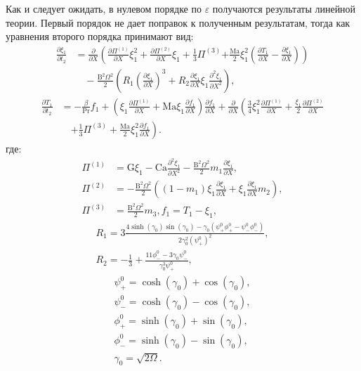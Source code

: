 \documentclass[12pt,a4paper]{article}
\begin{document}
Как и следует ожидать, в нулевом порядке по $\varepsilon$ получаются результаты линейной теории. Первый порядок не дает поправок к полученным результатам, тогда как уравнения второго порядка принимают вид:
\begin{align}
	\frac{\partial\xi_1}{\partial t_2} &= \frac{\partial}{\partial X}\left(\frac{\partial\Pi^{(1)}}{\partial X}\xi_1^2 
	+ \frac{\partial\Pi^{(2)}}{\partial X}\xi_1 + \frac{1}{3}\Pi^{(3)} \right.  \left. + \frac{\mathrm{Ma}}{2}\xi_1^2\left(\frac{\partial T_1}{\partial X} - \frac{\partial\xi_1}{\partial X}\right)\right)
	\nonumber \\
	&\quad - \frac{\mathrm{B}^2\Omega^2}{2}\left(R_1\left(\frac{\partial\xi_1}{\partial X}\right)^3 
	+ R_2\frac{\partial\xi_1}{\partial X}\xi_1\frac{\partial^2\xi_1}{\partial X^2}\right),
\end{align}
\begin{align}
	\frac{\partial T_1}{\partial t_2} &= -\frac{\beta}{\mathrm{Pr}} f_1   + \left(\xi_1\frac{\partial\Pi^{(1)}}{\partial X} 
	+ \mathrm{Ma}\xi_1\frac{\partial f_1}{\partial X}\right)\frac{\partial f_1}{\partial X} + \frac{\partial}{\partial X}\left(\frac{3}{4}\xi_1^2\frac{\partial\Pi^{(1)}}{\partial X} 
	+ \frac{\xi_1}{2}\frac{\partial\Pi^{(2)}}{\partial X} \right. \nonumber \\
	&\quad \left. + \frac{1}{3}\Pi^{(3)} + \frac{\mathrm{Ma}}{2}\xi_1^2\frac{\partial f_1}{\partial X}\right).
\end{align}
где:
\begin{align*}
	\Pi^{(1)} &= \mathrm{G}\xi_1 - \mathrm{Ca}\frac{\partial^2\xi_1}{\partial X^2} - \frac{\mathrm{B}^2\Omega^2}{2}m_1\frac{\partial\xi_1}{\partial X}, \\
	\Pi^{(2)} &= - \frac{\mathrm{B}^2\Omega^2}{2}\left((1-m_1)\xi_1\frac{\partial\xi_1}{\partial X} + \right. \left. \xi_1\frac{\partial\xi_1}{\partial X}m_2\right), \\
	\Pi^{(3)} &= \frac{\mathrm{B}^2\Omega^2}{2}m_3, f_1=T_1-\xi_1,
\end{align*}
\begin{align*}
	R_1 = 3\frac{4\sinh(\gamma_0)\sin(\gamma_0) - \gamma_0(\psi_+^0\phi_+^0 - \psi_-^0\phi_-^0)}{2\gamma_0^2(\psi_+^0)^2}, \\
	R_2 = -\frac{1}{3} + \frac{11\phi_-^0 - 3\gamma_0\psi_-^0}{\gamma_0^3\psi_+^{0}},
\end{align*}
\begin{align*}
	\psi_+^0 = \cosh(\gamma_0) + \cos(\gamma_0), \\ 
	\psi_-^0 = \cosh(\gamma_0) - \cos(\gamma_0), \\ 
	\phi_+^0 = \sinh(\gamma_0) + \sin(\gamma_0), \\ 
	\phi_-^0 = \sinh(\gamma_0) - \sin(\gamma_0), \\
	\gamma_0= \sqrt{2\Omega}.
\end{align*}
\end{document}
